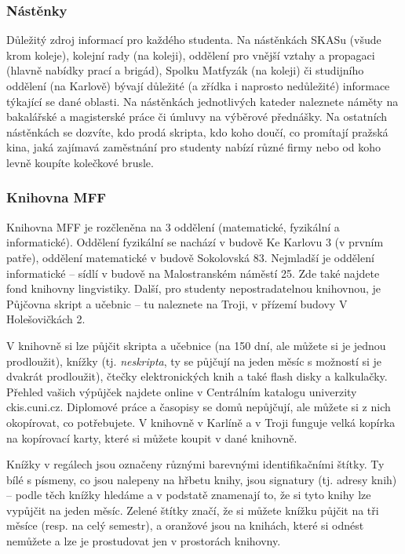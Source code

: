 \subsubsection{Nástěnky}
Důležitý zdroj informací pro každého studenta. Na nástěnkách SKASu (všude krom
koleje), kolejní rady (na koleji), oddělení pro vnější vztahy a propagaci
(hlavně nabídky prací a brigád), Spolku Matfyzák (na koleji) či studijního
oddělení (na Karlově) bývají důležité (a zřídka i naprosto nedůležité) informace
týkající se dané oblasti. Na nástěnkách jednotlivých kateder naleznete náměty na
bakalářské a magisterské práce či úmluvy na výběrové přednášky. Na ostatních
nástěnkách se dozvíte, kdo prodá skripta, kdo koho doučí, co promítají pražská
kina, jaká zajímavá zaměstnání pro studenty nabízí různé firmy nebo od koho
levně koupíte kolečkové brusle.


\subsubsection{Knihovna MFF}
Knihovna MFF je rozčleněna na 3 oddělení (matematické, fyzikální a
informatické). Oddělení fyzikální se nachází v budově Ke Karlovu 3 (v prvním
patře), oddělení matematické v budově Sokolovská 83. Nejmladší je oddělení
informatické – sídlí v budově na Malostranském náměstí 25. Zde také najdete fond
knihovny lingvistiky. Další, pro studenty nepostradatelnou knihovnou, je
Půjčovna skript a učebnic – tu naleznete na Troji, v přízemí budovy V
Holešovičkách 2.

V knihovně si lze půjčit skripta a učebnice (na 150 dní, ale můžete si je jednou
prodloužit), knížky (tj. \textit{neskripta}, ty se půjčují na jeden měsíc s
možností si je dvakrát prodloužit), čtečky elektronických knih a také flash
disky a kalkulačky. Přehled vašich výpůjček najdete online v Centrálním katalogu
univerzity ckis.cuni.cz. Diplomové práce a časopisy se domů nepůjčují, ale
můžete si z nich okopírovat, co potřebujete. V knihovně v Karlíně a v Troji
funguje velká kopírka na kopírovací karty, které si můžete koupit v dané
knihovně.

Knížky v regálech jsou označeny různými barevnými identifikačními štítky. Ty
bílé s písmeny, co jsou nalepeny na hřbetu knihy, jsou signatury (tj. adresy
knih) – podle těch knížky hledáme a v podstatě znamenají to, že si tyto knihy
lze vypůjčit na jeden měsíc. Zelené štítky značí, že si můžete knížku půjčit na
tři měsíce (resp. na celý semestr), a oranžové jsou na knihách, které si odnést
nemůžete a lze je prostudovat jen v prostorách knihovny.

